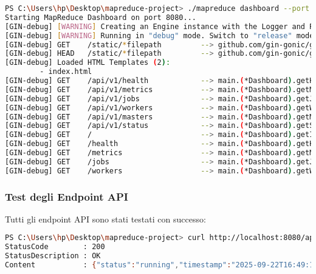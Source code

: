 \documentclass[12pt,a4paper]{article}
\begin{document}
\begin{lstlisting}[language=bash, caption=Test di Avvio Dashboard]
PS C:\Users\hp\Desktop\mapreduce-project> ./mapreduce dashboard --port 8080
Starting MapReduce Dashboard on port 8080...
[GIN-debug] [WARNING] Creating an Engine instance with the Logger and Recovery middleware already attached.
[GIN-debug] [WARNING] Running in "debug" mode. Switch to "release" mode in production.
[GIN-debug] GET    /static/*filepath         --> github.com/gin-gonic/gin.(*RouterGroup).createStaticHandler.func1 (3 handlers)
[GIN-debug] HEAD   /static/*filepath         --> github.com/gin-gonic/gin.(*RouterGroup).createStaticHandler.func1 (3 handlers)
[GIN-debug] Loaded HTML Templates (2):
        - index.html
[GIN-debug] GET    /api/v1/health            --> main.(*Dashboard).getHealth-fm (3 handlers)
[GIN-debug] GET    /api/v1/metrics           --> main.(*Dashboard).getMetrics-fm (3 handlers)
[GIN-debug] GET    /api/v1/jobs              --> main.(*Dashboard).getJobs-fm (3 handlers)
[GIN-debug] GET    /api/v1/workers           --> main.(*Dashboard).getWorkers-fm (3 handlers)
[GIN-debug] GET    /api/v1/masters           --> main.(*Dashboard).getMasters-fm (3 handlers)
[GIN-debug] GET    /api/v1/status            --> main.(*Dashboard).getStatus-fm (3 handlers)
[GIN-debug] GET    /                         --> main.(*Dashboard).getIndex-fm (3 handlers)
[GIN-debug] GET    /health                   --> main.(*Dashboard).getHealthPage-fm (3 handlers)
[GIN-debug] GET    /metrics                  --> main.(*Dashboard).getMetricsPage-fm (3 handlers)
[GIN-debug] GET    /jobs                     --> main.(*Dashboard).getJobsPage-fm (3 handlers)
[GIN-debug] GET    /workers                  --> main.(*Dashboard).getWorkersPage-fm (3 handlers)
\end{lstlisting}

\subsubsection{Test degli Endpoint API}

Tutti gli endpoint API sono stati testati con successo:

\begin{lstlisting}[language=bash, caption=Test Endpoint Status]
PS C:\Users\hp\Desktop\mapreduce-project> curl http://localhost:8080/api/v1/status
StatusCode        : 200
StatusDescription : OK
Content           : {"status":"running","timestamp":"2025-09-22T16:49:11.6525985+02:00","uptime":"1m46.1235474s","version":"1.0.0"}
\end{lstlisting}
\end{document}
